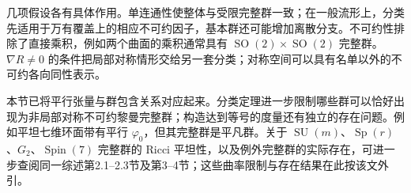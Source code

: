 \ProseParagraphBreak

几项假设各有具体作用。单连通性使整体与受限完整群一致；在一般流形上，分类先适用于万有覆盖上的相应不可约因子，基本群还可能增加离散分支。不可约性排除了直接乘积，例如两个曲面的乘积通常具有 \(\operatorname{SO}(2)\times\operatorname{SO}(2)\) 完整群。\(\nabla R\ne0\) 的条件把局部对称情形交给另一套分类；对称空间可以具有名单以外的不可约各向同性表示。

\ProseParagraphBreak

本节已将平行张量与群包含关系对应起来。分类定理进一步限制哪些群可以恰好出现为非局部对称不可约黎曼完整群；构造达到等号的度量还有独立的存在问题。例如平坦七维环面带有平行 \(\varphi_0\)，但其完整群是平凡群。关于 \(\operatorname{SU}(m)\)、\(\operatorname{Sp}(r)\)、\(G_2\)、\(\operatorname{Spin}(7)\) 完整群的 Ricci 平坦性，以及例外完整群的实际存在，可进一步查阅同一综述第2.1--2.3节及第3--4节；这些曲率限制与存在结果在此按该文外引。
